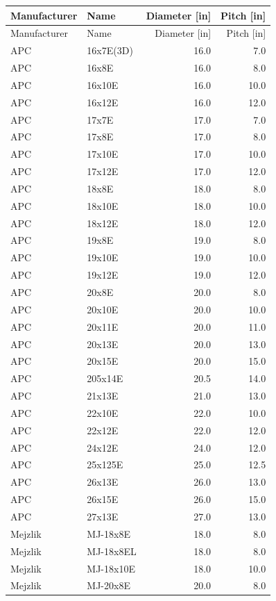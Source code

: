 \documentclass[11pt,letterpaper]{article}
\begin{document}
\begin{center}
\begin{longtable}{@{}llrr@{}}
\toprule
Manufacturer & Name & Diameter [in] & Pitch [in] \\
\midrule
\endfirsthead
\toprule
Manufacturer & Name & Diameter [in] & Pitch [in] \\
\midrule
\endhead
APC & 16x7E(3D) & 16.0 & 7.0 \\
APC & 16x8E & 16.0 & 8.0 \\
APC & 16x10E & 16.0 & 10.0 \\
APC & 16x12E & 16.0 & 12.0 \\
APC & 17x7E & 17.0 & 7.0 \\
APC & 17x8E & 17.0 & 8.0 \\
APC & 17x10E & 17.0 & 10.0 \\
APC & 17x12E & 17.0 & 12.0 \\
APC & 18x8E & 18.0 & 8.0 \\
APC & 18x10E & 18.0 & 10.0 \\
APC & 18x12E & 18.0 & 12.0 \\
APC & 19x8E & 19.0 & 8.0 \\
APC & 19x10E & 19.0 & 10.0 \\
APC & 19x12E & 19.0 & 12.0 \\
APC & 20x8E & 20.0 & 8.0 \\
APC & 20x10E & 20.0 & 10.0 \\
APC & 20x11E & 20.0 & 11.0 \\
APC & 20x13E & 20.0 & 13.0 \\
APC & 20x15E & 20.0 & 15.0 \\
APC & 205x14E & 20.5 & 14.0 \\
APC & 21x13E & 21.0 & 13.0 \\
APC & 22x10E & 22.0 & 10.0 \\
APC & 22x12E & 22.0 & 12.0 \\
APC & 24x12E & 24.0 & 12.0 \\
APC & 25x125E & 25.0 & 12.5 \\
APC & 26x13E & 26.0 & 13.0 \\
APC & 26x15E & 26.0 & 15.0 \\
APC & 27x13E & 27.0 & 13.0 \\
Mejzlik & MJ-18x8E & 18.0 & 8.0 \\
Mejzlik & MJ-18x8EL & 18.0 & 8.0 \\
Mejzlik & MJ-18x10E & 18.0 & 10.0 \\
Mejzlik & MJ-20x8E & 20.0 & 8.0 \\

\end{longtable}
\end{center}
\end{document}
